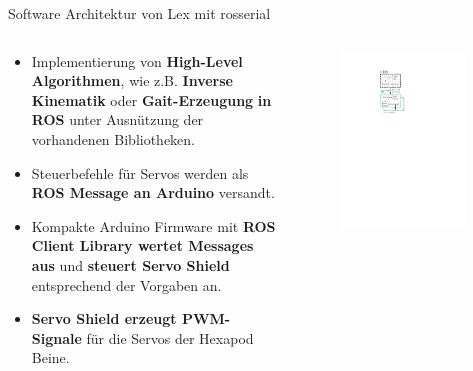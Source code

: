 \documentclass{beamer}
\begin{document}
\begin{frame}{Software Architektur von Lex mit rosserial}
\begin{columns}
\begin{column}{0.7\textwidth}
\begin{itemize}
	\item Implementierung von \textbf{High-Level Algorithmen}, wie z.B. \textbf{Inverse Kinematik} oder \textbf{Gait-Erzeugung} \textbf{in ROS} unter Ausn\"utzung der vorhandenen Bibliotheken.
\end{itemize}
\begin{itemize}
	\item Steuerbefehle f\"ur Servos werden als \textbf{ROS Message an Arduino} versandt.
\end{itemize}
\begin{itemize}
	\item Kompakte Arduino Firmware mit \textbf{ROS Client Library wertet Messages aus} und \textbf{steuert Servo Shield} entsprechend der Vorgaben an.
\end{itemize}
\begin{itemize}
	\item \textbf{Servo Shield erzeugt PWM-Signale} f\"ur die Servos der Hexapod Beine.
\end{itemize}
\end{column}
	\begin{column}{0.3\textwidth}
		\begin{figure}[H]
			\centering
			\includegraphics[width=0.95\textwidth]{./images/rosserial-servo-shield.pdf}

\end{figure}
\end{column}
\end{columns}
\end{frame}
\end{document}
